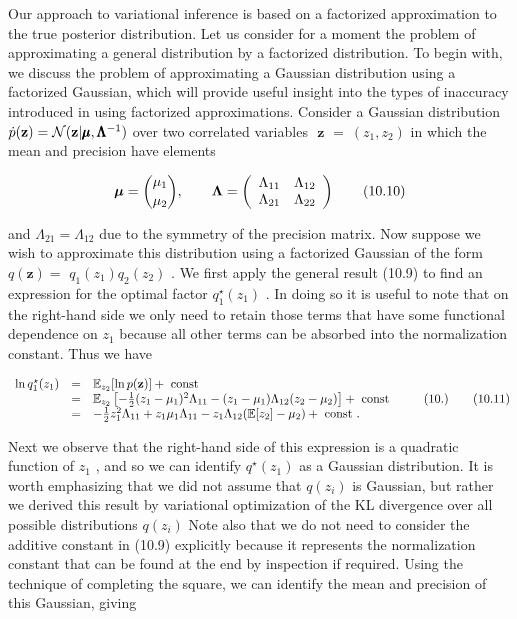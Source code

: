 \documentclass[
  10
]{article}
\begin{document}
Our approach to variational inference is based on a factorized
approximation to the true posterior distribution. Let us consider for a
moment the problem of approximating a general distribution by a
factorized distribution. To begin with, we discuss the problem of
approximating a Gaussian distribution using a factorized Gaussian, which
will provide useful insight into the types of inaccuracy introduced in
using factorized approximations. Consider a Gaussian distribution
\(\dot { p } ( { \bf z } ) = \mathcal { N } ( { \bf z } | \pmb { \mu } , \pmb { \Lambda } ^ { - 1 } )\)
over two correlated variables
\(\textbf { z } = \ ( z _ { 1 } , z _ { 2 } )\) in which the mean and
precision have elements

\[
\boldsymbol {\mu} = \binom{\mu_ {1}}{\mu_ {2}}, \qquad \boldsymbol {\Lambda} = \left( \begin{array}{c c} \Lambda_ {1 1} & \Lambda_ {1 2} \\ \Lambda_ {2 1} & \Lambda_ {2 2} \end{array} \right)\tag{10.10}
\]

and \(\Lambda _ { 2 1 } = \Lambda _ { 1 2 }\) due to the symmetry of the
precision matrix. Now suppose we wish to approximate this distribution
using a factorized Gaussian of the form \(q ( \mathbf { z } ) =\)
\(q _ { 1 } ( z _ { 1 } ) q _ { 2 } ( z _ { 2 } )\) . We first apply the
general result (10.9) to find an expression for the optimal factor
\(q _ { 1 } ^ { \star } ( z _ { 1 } )\) . In doing so it is useful to
note that on the right-hand side we only need to retain those terms that
have some functional dependence on \(z _ { 1 }\) because all other terms
can be absorbed into the normalization constant. Thus we have

\[
\begin{array}{r c l} \ln q _ {1} ^ {\star} (z _ {1}) & = & \mathbb {E} _ {z _ {2}} [ \ln p (\mathbf {z}) ] + \text { const } \\ & = & \mathbb {E} _ {z _ {2}} \left[ - \frac {1}{2} (z _ {1} - \mu_ {1}) ^ {2} \Lambda_ {1 1} - (z _ {1} - \mu_ {1}) \Lambda_ {1 2} (z _ {2} - \mu_ {2}) \right] + \text { const } \\ & = & - \frac {1}{2} z _ {1} ^ {2} \Lambda_ {1 1} + z _ {1} \mu_ {1} \Lambda_ {1 1} - z _ {1} \Lambda_ {1 2} (\mathbb {E} [ z _ {2} ] - \mu_ {2}) + \text { const }. \end{array} \tag {10.}\tag{10.11}
\]

Next we observe that the right-hand side of this expression is a
quadratic function of \(z _ { 1 }\) , and so we can identify
\(q ^ { \star } ( z _ { 1 } )\) as a Gaussian distribution. It is worth
emphasizing that we did not assume that \(q ( z _ { i } )\) is Gaussian,
but rather we derived this result by variational optimization of the KL
divergence over all possible distributions \(q ( z _ { i } )\) Note also
that we do not need to consider the additive constant in (10.9)
explicitly because it represents the normalization constant that can be
found at the end by inspection if required. Using the technique of
completing the square, we can identify the mean and precision of this
Gaussian, giving
\end{document}
